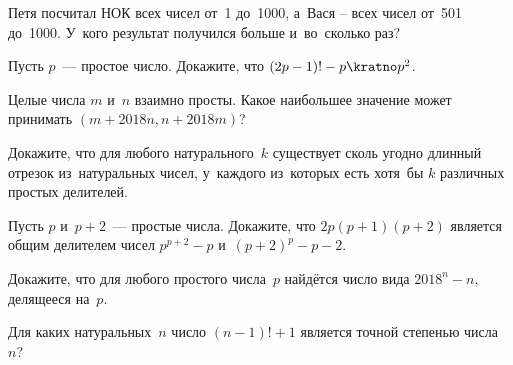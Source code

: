 


\begin{problems}

\item
Петя посчитал НОК всех чисел от~1 до~1000, а~Вася -- всех чисел от~501 до~1000.
У~кого результат получился больше и~во~сколько раз?

\item
Пусть $p$~--- простое число.
Докажите, что $(2 p - 1)! - p \kratno p^2$.

\item
Целые числа $m$ и~$n$ взаимно просты.
Какое наибольшее значение может принимать $(m + 2018 n, n + 2018 m)$?

\item
Докажите, что для любого натурального~$k$ существует сколь угодно длинный
отрезок из~натуральных чисел, у~каждого из~которых есть хотя~бы $k$ различных
простых делителей.

\item
Пусть $p$ и~$p+2$~--- простые числа.
Докажите, что $2 p (p + 1) (p + 2)$ является общим делителем чисел
$p^{p+2} - p$ и~$(p + 2)^{p} - p - 2$.


\item
Докажите, что для любого простого числа~$p$ найдётся число вида $2018^{n} - n$,
делящееся на~$p$.


\item
Для каких натуральных~$n$ число $(n - 1)! + 1$ является точной степенью числа~$n$?

\end{problems}

